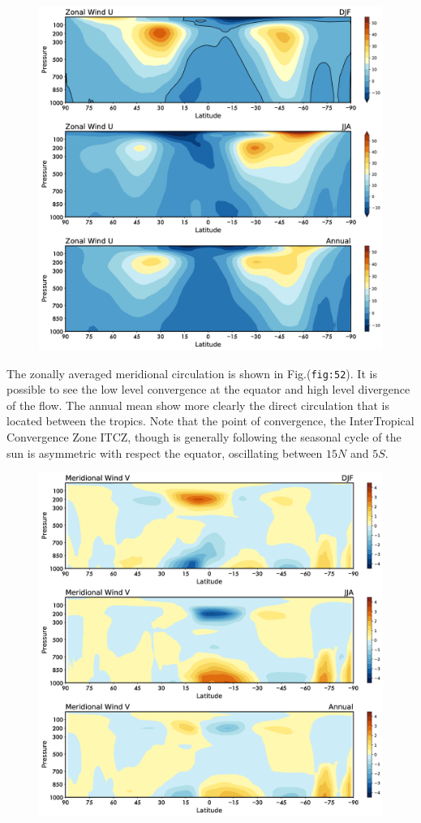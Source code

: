 \begin{figure}
\centering
\includegraphics[width = .7 \textwidth]{figs/GD/Uzonal.png}
\caption{}\label{}
\end{figure}

The zonally averaged meridional circulation is shown in
Fig.(\texttt{fig:52}). It is possible to see the low level convergence
at the equator and high level divergence of the flow. The annual mean
show more clearly the direct circulation that is located between the
tropics. Note that the point of convergence, the InterTropical
Convergence Zone  ITCZ, though is generally following the seasonal
cycle of the sun is asymmetric with respect the equator, oscillating
between \(15N\) and \(5S\).

\begin{figure}
\centering
\includegraphics[width = .7 \textwidth]{figs/GD/Vzonal.png}
\caption{}\label{}
\end{figure}

